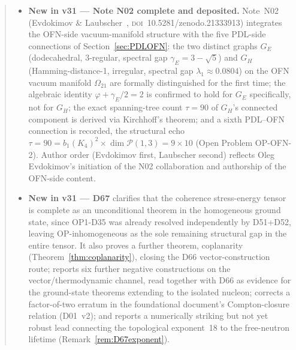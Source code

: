 \documentclass[11pt,a4paper]{article}
\theoremstyle{plain}
\theoremstyle{definition}
\theoremstyle{remark}
\newcommand{\Kfour}{K_4}
\begin{document}
\begin{abstract}
\begin{itemize}
\item \textbf{New in v31 --- Note N02 complete and deposited.} Note~N02 (Evdokimov \& Laubscher~\cite{N02}, \textsc{doi}~10.5281/zenodo.21333913) integrates the OFN-side vacuum-manifold structure with the five PDL-side connections of Section~\ref{sec:PDLOFN}: the two distinct graphs $G_E$ (dodecahedral, 3-regular, spectral gap $\gamma_E=3-\sqrt5$) and $G_H$ (Hamming-distance-1, irregular, spectral gap $\lambda_1\approx0.0804$) on the OFN vacuum manifold $\Omega_{21}$ are formally distinguished for the first time; the algebraic identity $\varphi+\gamma_E/2=2$ is confirmed to hold for $G_E$ specifically, not for $G_H$; the exact spanning-tree count $\tau=90$ of $G_H$'s connected component is derived via Kirchhoff's theorem; and a sixth PDL--OFN connection is recorded, the structural echo $\tau=90=b_1(\Kfour)^2\times\dim\mathcal P(1,3)=9\times10$ (Open Problem OP-OFN-2). Author order (Evdokimov first, Laubscher second) reflects Oleg Evdokimov's initiation of the N02 collaboration and authorship of the OFN-side content.
\item \textbf{New in v31 --- D67} clarifies that the coherence stress-energy tensor is complete as an unconditional theorem in the homogeneous ground state, since OP1-D35 was already resolved independently by D51+D52, leaving OP-inhomogeneous as the sole remaining structural gap in the entire tensor. It also proves a further theorem, coplanarity (Theorem~\ref{thm:coplanarity}), closing the D66 vector-construction route; reports six further negative constructions on the vector/thermodynamic channel, read together with D66 as evidence for the ground-state theorems extending to the isolated nucleon; corrects a factor-of-two erratum in the foundational document's Compton-closure relation (D01~v2); and reports a numerically striking but not yet robust lead connecting the topological exponent~18 to the free-neutron lifetime (Remark~\ref{rem:D67exponent}).

\end{itemize}
\end{abstract}
\end{document}
